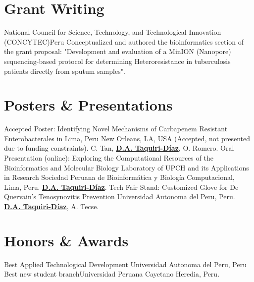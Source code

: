 \documentclass[11pt,a4paper,sans]{moderncv}
\begin{document}
\section{Grant Writing}
  {National Council for Science, Technology, and Technological Innovation (CONCYTEC)}{Peru}
  {}
  {Conceptualized and authored the bioinformatics section of the grant proposal: "Development and evaluation of a MinION (Nanopore) sequencing-based protocol for determining
Heteroresistance in tuberculosis patients directly from sputum samples".
}


\section{Posters \& Presentations}

  {Accepted Poster: Identifying Novel Mechanisms of Carbapenem Resistant Enterobacterales in Lima, Peru}
  {New Orleans, LA, USA (Accepted, not presented due to funding constraints). C. Tan, \textbf{\underline{D.A. Taquiri-Díaz}}, O. Romero.}{}
  {}
  {Oral Presentation (online): Exploring the Computational Resources of the Bioinformatics and Molecular Biology Laboratory of UPCH and its Applications in Research}
  {Sociedad Peruana de Bioinformática y Biología Computacional, Lima, Peru. \textbf{\underline{D.A. Taquiri-Díaz}}.}{}
  {}
  {Tech Fair Stand: Customized Glove for De Quervain's Tenosynovitis Prevention}
  {Universidad Autonoma del Peru, Peru. \textbf{\underline{D.A. Taquiri-Díaz}}, A. Tecse.}{}
  {}


\section{Honors \& Awards}
  {Best Applied Technological Development}
  {Universidad Autonoma del Peru, Peru}{}
  {}
  {Best new student branch}{Universidad Peruana Cayetano Heredia, Peru.}{}
  {}
\end{document}
